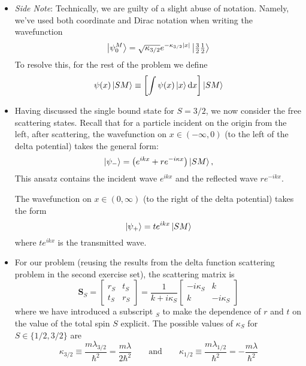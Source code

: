 \documentclass[11pt, a4paper]{article}
\newcommand{\diff}{\mathop{}\!\mathrm{d}} %
\newcommand{\eqtext}[1]{\qquad \text{#1} \qquad}
\newcommand{\mat}[1]{\mathbf{#1}} %
\begin{document}
\begin{itemize}
	\item \textit{Side Note}: Technically, we are guilty of a slight abuse of notation. Namely, we've used both coordinate and Dirac notation when writing the wavefunction
	\begin{equation*}
		\ket{\psi_{0}^{M}} = \sqrt{\kappa_{3/2}}e^{-\kappa_{3/2}\abs{x}} \ket{\tfrac{3}{2}\tfrac{1}{2}}
	\end{equation*}
	To resolve this, for the rest of the problem we define 
	\begin{equation*}
		\psi(x)\ket{SM} \equiv \left[\int \psi(x) \ket{x} \diff x \right] \ket{SM}
	\end{equation*}
	
	\item Having discussed the single bound state for $ S = 3/2 $, we now consider the free scattering states. Recall that for a particle incident on the origin from the left, after scattering, the wavefunction on $ x \in (-\infty, 0) $ (to the left of the delta potential) takes the general form:
	\begin{equation*}
		\ket{\psi_{-}} = \left(e^{ik x} + re^{-i\kappa x}\right)\ket{SM},
	\end{equation*}
	This ansatz contains the incident wave $ e^{ikx} $ and the reflected wave $ re^{-ikx} $. 
	
	The wavefunction on $ x \in (0, \infty)  $ (to the right of the delta potential) takes the form
	\begin{equation*}
		\ket{\psi_{+}} = t e^{ikx}\ket{SM}
	\end{equation*}
	where $ te^{ikx} $ is the transmitted wave.
	
	\item For our problem (reusing the results from the delta function scattering problem in the second exercise set), the scattering matrix is
	\begin{equation*}
		\mat{S}_{S} = 
		\begin{bmatrix}
			r_{S} & t_{S}\\
			t_{S} & r_{S}
		\end{bmatrix}
		= 
		\frac{1}{k + i \kappa_{S}}
		\begin{bmatrix}
			-i\kappa_{S} & k\\
			k & -i \kappa_{S}
		\end{bmatrix}
	\end{equation*}
	where we have introduced a subscript $ _{S} $ to make the dependence of $ r $ and $ t $ on the value of the total spin $ S $ explicit. The possible values of $ \kappa_{S} $ for $ S \in \{1/2, 3/2\} $ are
	\begin{equation*}
		\kappa_{3/2} \equiv \frac{m\lambda_{3/2}}{\hbar^{2}} = \frac{m\lambda}{2\hbar^{2}} \eqtext{and} \kappa_{1/2} \equiv \frac{m\lambda_{1/2}}{\hbar^{2}} = - \frac{m\lambda}{\hbar^{2}}
	\end{equation*}
	

\end{itemize}
\end{document}
